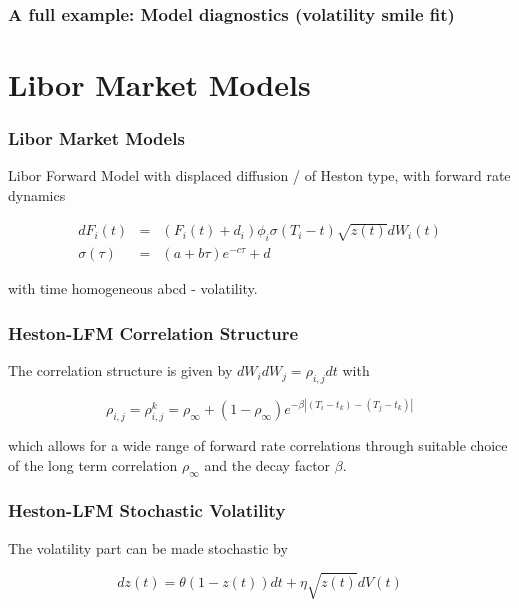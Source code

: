 \documentclass{beamer}
\begin{document}
\begin{frame}[fragile]
\frametitle{A full example: Model diagnostics (volatility smile fit)}
\end{frame}


\section{Libor Market Models}

\begin{frame}
\frametitle{Libor Market Models}
Libor Forward Model with displaced diffusion / of Heston type, with forward rate dynamics

\begin{eqnarray}
dF_i(t) &=&  (F_i(t) + d_i) \phi_i \sigma(T_i - t) \sqrt{z(t)} dW_i(t) \\
\sigma(\tau) &=& (a + b\tau) e^{-c\tau} + d
\end{eqnarray} 

with time homogeneous abcd - volatility.
\end{frame}


\begin{frame}
\frametitle{Heston-LFM Correlation Structure}
The correlation structure is given by $dW_i dW_j = \rho_{i,j} dt$ with

\begin{equation}
\rho_{i,j} = \rho_{i,j}^k = \rho_\infty + (1-\rho_\infty) e^{-\beta |(T_i-t_k)-(T_j-t_k)|}
\end{equation}

which allows for a wide range of forward rate correlations through suitable choice of the long term correlation $\rho_\infty$ and the decay factor $\beta$.
\end{frame}


\begin{frame}
\frametitle{Heston-LFM Stochastic Volatility}
The volatility part can be made stochastic by

\begin{equation}
dz(t) = \theta ( 1 - z(t) ) dt + \eta \sqrt{z(t)} dV(t)
\end{equation}

\end{frame}
\end{document}

